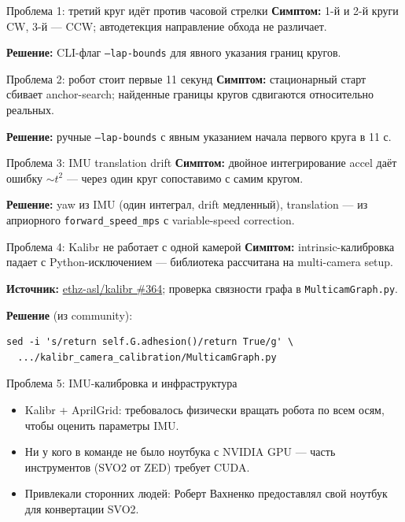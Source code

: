 \documentclass[aspectratio=169]{beamer}
\newcommand{\code}[1]{\texttt{#1}}
\begin{document}
\begin{frame}{Проблема 1: третий круг идёт против часовой стрелки}
    \textbf{Симптом:} 1-й и 2-й круги CW, 3-й --- CCW; автодетекция направление обхода не различает.

    \vspace{0.4em}
    \textbf{Решение:} CLI-флаг \code{--lap-bounds} для явного указания границ кругов.
\end{frame}

\begin{frame}{Проблема 2: робот стоит первые 11 секунд}
    \textbf{Симптом:} стационарный старт сбивает anchor-search; найденные границы кругов сдвигаются относительно реальных.

    \vspace{0.4em}
    \textbf{Решение:} ручные \code{--lap-bounds} с явным указанием начала первого круга в 11 с.
\end{frame}

\begin{frame}{Проблема 3: IMU translation drift}
    \textbf{Симптом:} двойное интегрирование accel даёт ошибку $\sim t^2$ --- через один круг сопоставимо с самим кругом.

    \vspace{0.4em}
    \textbf{Решение:} yaw из IMU (один интеграл, drift медленный), translation --- из априорного \code{forward\_speed\_mps} с variable-speed correction.
\end{frame}

\begin{frame}[fragile]{Проблема 4: Kalibr не работает с одной камерой}
    \textbf{Симптом:} intrinsic-калибровка падает с Python-исключением --- библиотека рассчитана на multi-camera setup.

    \vspace{0.4em}
    \textbf{Источник:} \href{https://github.com/ethz-asl/kalibr/issues/364}{ethz-asl/kalibr \#364}; проверка связности графа в \code{MulticamGraph.py}.

    \vspace{0.4em}
    \textbf{Решение} (из community):
    \begin{verbatim}
sed -i 's/return self.G.adhesion()/return True/g' \
  .../kalibr_camera_calibration/MulticamGraph.py
    \end{verbatim}
\end{frame}

\begin{frame}{Проблема 5: IMU-калибровка и инфраструктура}
    \begin{itemize}
        \item Kalibr + AprilGrid: требовалось физически вращать робота по всем осям, чтобы оценить параметры IMU.
        \item Ни у кого в команде не было ноутбука с NVIDIA GPU --- часть инструментов (SVO2 от ZED) требует CUDA.
        \item Привлекали сторонних людей: Роберт Вахненко предоставлял свой ноутбук для конвертации SVO2.
    \end{itemize}
\end{frame}
\end{document}
